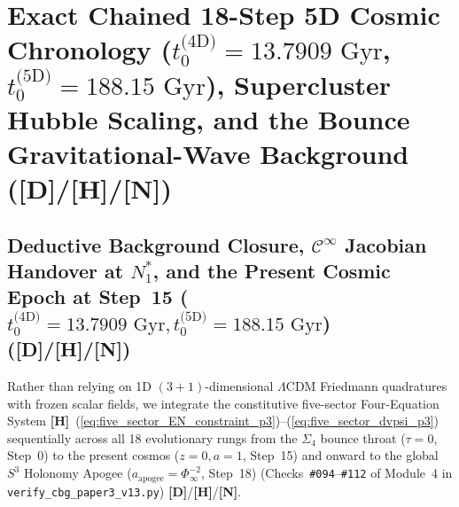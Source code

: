 \documentclass[11pt,a4paper]{article}
\newcommand{\catD}{\textbf{\textcolor{blue!75!black}{[D]}}}
\newcommand{\catH}{\textbf{\textcolor{orange!85!black}{[H]}}}
\newcommand{\catN}{\textbf{\textcolor{teal!75!black}{[N]}}}
\theoremstyle{plain}
\theoremstyle{definition}
\theoremstyle{remark}
\numberwithin{equation}{section}
\begin{document}
\section{\texorpdfstring{Exact Chained 18-Step 5D Cosmic Chronology ($t_0^{\text{(4D)}} = 13.7909\text{ Gyr}$, $t_0^{\text{(5D)}} = 188.15\text{ Gyr}$), Supercluster Hubble Scaling, and the Bounce Gravitational-Wave Background (\catD/\catH/\catN)}{Exact Chained 18-Step 5D Cosmic Chronology, Supercluster Hubble Scaling, and the Bounce Gravitational-Wave Background}}

\subsection{\texorpdfstring{Deductive Background Closure, $\mathcal{C}^{\infty}$ Jacobian Handover at $N_1^*$, and the Present Cosmic Epoch at Step~15 ($t_0^{\text{(4D)}} = 13.7909\text{ Gyr}, t_0^{\text{(5D)}} = 188.15\text{ Gyr}$) (\catD/\catH/\catN)}{Deductive Background Closure, C^infty Jacobian Handover at N_1*, and the Present Cosmic Epoch at Step 15 ([D]/[H]/[N])}}

Rather than relying on 1D $(3+1)$-dimensional $\Lambda\text{CDM}$ Friedmann quadratures with frozen scalar fields, we integrate the constitutive five-sector Four-Equation System \catH~(\ref{eq:five_sector_EN_constraint_p3})--(\ref{eq:five_sector_dvpsi_p3}) sequentially across all 18 evolutionary rungs from the $\Sigma_4$ bounce throat ($\tau = 0$, Step~0) to the present cosmos ($z = 0, a = 1$, Step~15) and onward to the global $S^3$ Holonomy Apogee ($a_{\text{apogee}} = \Phi_{\infty}^{-2}$, Step~18) (Checks~\texttt{\#094}--\texttt{\#112} of Module~4 in \allowbreak\texttt{verify\_cbg\_paper3\_v13.py}) \catD/\catH/\catN.
\end{document}
